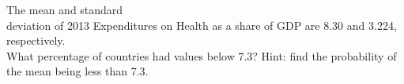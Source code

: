 \documentclass[11pt, chapterprefix=true]{scrbook}\usepackage[]{graphicx}\usepackage[]{color}
\begin{document}
\begin{exercises}
%
%
%
%
%
%
%
%
%










		\begin{exercise}  %

	  The mean and standard \\ deviation of 2013 Expenditures on Health as a share of GDP are 8.30 and 3.224, respectively.  \\ What percentage of countries had values below 7.3?   Hint: find the probability of the mean being less than 7.3.


\end{exercise}
\end{exercises}
\end{document}
